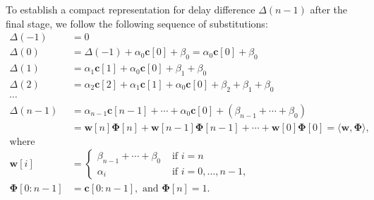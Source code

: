 \documentclass{article}
\newcommand{\vect}[1]{\mathbf{#1}}
\begin{document}
\begin{questions}
{To establish a compact representation for delay difference $\Delta(n-1)$ after the final stage, 
we follow the following sequence of substitutions: 
\begin{align}
\label{eq:PAPUF_model}
\Delta(-1) &= 0\\ \nonumber
\Delta(0) &= \Delta(-1) + \alpha_0\vect{c}[0] + \beta_0  = \alpha_0\vect{c}[0] + \beta_0\\ \nonumber
\Delta(1) &= \alpha_1\vect{c}[1] + \alpha_0\vect{c}[0] + \beta_1 + \beta_0 \\ \nonumber
\Delta(2) &= \alpha_2\vect{c}[2] + \alpha_1\vect{c}[1] + \alpha_0\vect{c}[0] + \beta_2 + \beta_1 + \beta_0 \\ \nonumber
\dotsb& \\ \nonumber
\Delta(n-1) &= \alpha_{n-1}\vect{c}[n-1] + \dotsb + \alpha_0\vect{c}[0] + (\beta_{n-1} + \dotsb + \beta_0) \\ \nonumber
          &= \vect{w}[n]\vect{\Phi}[n] +  \vect{w}[n-1]\vect{\Phi}[n-1] + \dotsb +\vect{w}[0]\vect{\Phi}[0] 
          = \langle \vect{w}{,}\vect{\Phi} \rangle, \\ \nonumber
\mbox{where} & \\\nonumber
\vect{w}[i] &= 
\begin{cases}
\beta_{n-1} + \dotsb + \beta_0 &\mbox{ if } i=n \\ \nonumber
\alpha_i                   &\mbox{ if } i=0,\dotsc,n-1, \nonumber
\end{cases}\\ 
\vect{\Phi}[0:n-1] &= \vect{c}[0:n-1],\mbox{  and  } \vect{\Phi}[n]=1.\nonumber
\end{align}




}
\end{questions}
\end{document}
